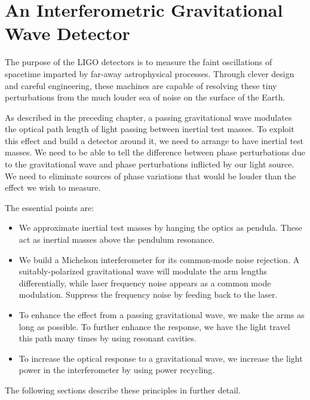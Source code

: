 \label{chapter2}

\section{An Interferometric Gravitational Wave Detector}

The purpose of the LIGO detectors is to measure the faint
oscillations of spacetime imparted by far-away astrophysical
processes.  Through clever design and careful engineering, these
machines are capable of resolving these tiny perturbations from the
much louder sea of noise on the surface of the Earth\cite{Saulson1994Fundamentals}.

As described in the preceding chapter, a passing gravitational wave modulates the optical
path length of light passing between inertial test
masses.  To exploit this effect and build a detector around it, we
need to arrange to have inertial test masses.  We need to be able to
tell the difference between phase perturbations due to the
gravitational wave and phase perturbations inflicted by our light
source.  We need to eliminate sources of phase variations that would
be louder than the effect we wish to measure.  

The essential points are:
\begin{itemize}
\item We approximate inertial test masses by hanging the optics as
  pendula.  These act as inertial masses above the pendulum resonance.
\item We build a Michelson interferometer for its common-mode noise
  rejection.  A suitably-polarized gravitational wave will modulate
  the arm lengths differentially, while laser frequency noise appears
  as a common mode modulation.  Suppress the frequency noise by
  feeding back to the laser.
\item To enhance the effect from a passing gravitational wave, we make
  the arms as long as possible.  To further enhance the response, we
  have the light travel this path many times by using resonant cavities.
\item To increase the optical response to a gravitational wave, we
  increase the light power in the interferometer by using power
  recycling.
\end{itemize}
The following sections describe these principles in further detail.

